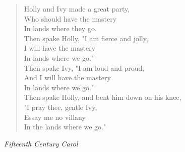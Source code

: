 
\begin{verse}
Holly and Ivy made a great party,\\
\hspace*{2em}Who should have the mastery\\
\hspace*{4em}In lands where they go.\\[0.7em]

Then spake Holly, "I am fierce and jolly,\\
I will have the mastery\\
\hspace*{4em}In lands where we go."\\[0.7em]

Then spake Ivy, "I am loud and proud,\\
And I will have the mastery\\
\hspace*{4em}In lands where we go."\\[0.7em]

Then spake Holly, and bent him down on his knee,\\
"I pray thee, gentle Ivy,\\
Essay me no villany\\
\hspace*{4em}In the lands where we go."%
\end{verse}

\vspace{0.5\baselineskip}
\noindent\textit{Fifteenth Century Carol}

\newpage
